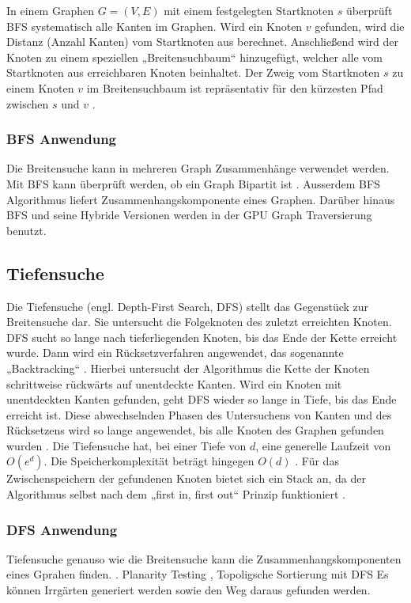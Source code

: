 In einem Graphen $G = (V, E)$ mit einem festgelegten Startknoten $s$ überprüft BFS systematisch alle Kanten im Graphen. Wird ein Knoten $v$ gefunden, wird die Distanz (Anzahl Kanten) vom Startknoten aus berechnet. Anschließend wird der Knoten zu einem speziellen „Breitensuchbaum“ hinzugefügt, welcher alle vom Startknoten aus erreichbaren Knoten beinhaltet. Der Zweig vom Startknoten $s$ zu einem Knoten $v$ im Breitensuchbaum ist repräsentativ für den kürzesten Pfad zwischen $s$ und $v$ \cite{Cormen.2009}.

\subsubsection{BFS Anwendung}
Die Breitensuche kann in mehreren Graph Zusammenhänge verwendet werden.  Mit BFS kann überprüft werden, ob ein Graph Bipartit ist \cite{propTest}. Ausserdem BFS Algorithmus liefert Zusammenhangskomponente eines Graphen\cite{schmitz}. Darüber hinaus BFS und seine Hybride Versionen\cite{effHyb} werden in der GPU Graph Traversierung benutzt\cite{scaleGPU}. 

\subsection{Tiefensuche}

Die Tiefensuche (engl. Depth-First Search, DFS) stellt das Gegenstück zur Breitensuche dar. Sie untersucht die Folgeknoten des zuletzt erreichten Knoten. DFS sucht so lange nach tieferliegenden Knoten, bis das Ende der Kette erreicht wurde. Dann wird ein Rücksetzverfahren angewendet, das sogenannte „Backtracking“ \cite{Tarjan.1972}. Hierbei untersucht der Algorithmus die Kette der Knoten schrittweise rückwärts auf unentdeckte Kanten. Wird ein Knoten mit unentdeckten Kanten gefunden, geht DFS wieder so lange in Tiefe, bis das Ende erreicht ist. Diese abwechselnden Phasen des Untersuchens von Kanten und des Rücksetzens wird so lange angewendet, bis alle Knoten des Graphen gefunden wurden \cite{Cormen.2009}. Die Tiefensuche hat, bei einer Tiefe von $d$, eine generelle Laufzeit von $O(e^d)$. Die Speicherkomplexität beträgt hingegen $O(d)$ \cite{Korf.1985}. Für das Zwischenspeichern der gefundenen Knoten bietet sich ein Stack an, da der Algorithmus selbst nach dem „first in, first out“ Prinzip funktioniert \cite{Tarjan.1972}.  


\subsubsection{DFS Anwendung}
Tiefensuche genauso wie die Breitensuche kann die Zusammenhangskomponenten eines Gprahen finden. \cite{schmitz} \cite{dfs}.  Planarity Testing \cite{dfsPlanar}, Topoligsche Sortierung mit DFS
Es können Irrgärten generiert werden sowie den Weg daraus gefunden werden\cite{examMaze}.


